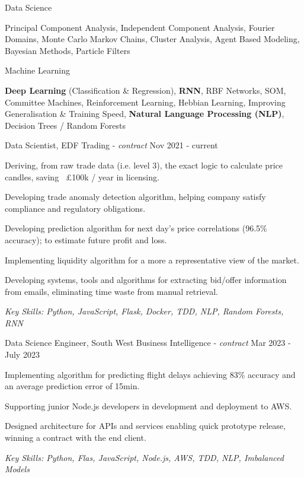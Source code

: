 \documentclass[11pt,article,oneside]{memoir}
\newenvironment{itemize*}{%
  \renewcommand\labelitemi{\textbullet}
  \footnotesize
  \begin{itemize}%
    \setlength{\itemsep}{0pt}}%
  {\end{itemize}
}
\begin{document}
\ind Data Science

\ind \hspace{0.354in} \footnotesize Principal Component Analysis, Independent Component Analysis, Fourier Domains,
Monte Carlo Markov Chains, Cluster Analysis, Agent Based Modeling, Bayesian Methods, Particle Filters \normalsize

\ind Machine Learning 

\ind \hspace{0.354in} \footnotesize \textbf{Deep Learning} (Classification \& Regression), \textbf{RNN}, RBF Networks, SOM, Committee Machines,
Reinforcement Learning, Hebbian Learning, Improving Generalisation \& Training Speed, \textbf{Natural Language Processing (NLP)}, Decision Trees / Random Forests \normalsize

\bigskip
 

\normalsize
\medskip
\ind Data Scientist, EDF Trading - \emph{contract} \hfill Nov 2021 - current
\begin{itemize*}
    \item Deriving, from raw trade data (i.e. level 3), the exact logic to calculate price candles, saving ~£100k / year in licensing.
    \item Developing trade anomaly detection algorithm, helping company satisfy compliance and regulatory obligations.
    \item Developing prediction algorithm for next day's price correlations (96.5\% accuracy); to estimate future profit and loss. 
    \item Implementing liquidity algorithm for a more a representative view of the market.
    \item Developing systems, tools and algorithms for extracting bid/offer information from emails, eliminating time waste from manual retrieval. 
\end{itemize*}
\ind \hspace{0.35in} \footnotesize \emph{Key Skills: Python, JavaScript, Flask, Docker, TDD, NLP, Random Forests, RNN}

\normalsize
\medskip
\ind Data Science Engineer, South West Business Intelligence - \emph{contract} \hfill Mar 2023 - July 2023
\begin{itemize*}
    \item Implementing algorithm for predicting flight delays achieving 83\% accuracy and an average prediction error of 15min.
    \item Supporting junior Node.js developers in development and deployment to AWS. 
    \item Designed architecture for APIs and services enabling quick prototype release, winning a contract with the end client.
\end{itemize*}
\ind \hspace{0.35in} \footnotesize \emph{Key Skills: Python, Flas, JavaScript, Node.js, AWS, TDD, NLP, Imbalanced Models}
\end{document}
